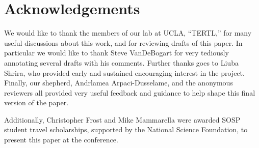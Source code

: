 \section*{Acknowledgements}

We would like to thank the members of our lab at UCLA, ``TERTL,'' for many
useful discussions about this work, and for reviewing drafts of this paper. In
particular we would like to thank Steve VanDeBogart for very tediously
annotating several drafts with his comments. Further thanks goes to Liuba
Shrira, who provided early and sustained encouraging interest in the project.
Finally, our shepherd, Andrlamea Arpaci-Dusselame, and the anonymous reviewers
all provided very useful feedback and guidance to help shape this final version
of the paper.

Additionally, Christopher Frost and Mike Mammarella were awarded SOSP student
travel scholarships, supported by the National Science Foundation, to present
this paper at the conference.
